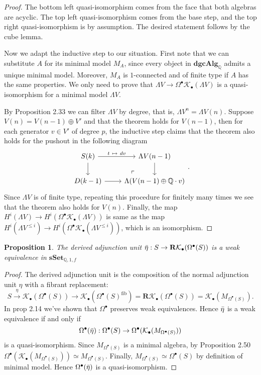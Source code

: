 \documentclass[psamsfonts]{amsart}
\newtheorem{prop}{Proposition}[section]
\theoremstyle{definition}
\newcommand{\Q}{\mathbb{Q}}
\newcommand{\sSet}{\mathbf{sSet}}
\newcommand{\dgcAlg}{\mathbf{dgcAlg}}
\numberwithin{equation}{section}
\begin{document}
\begin{proof}
The bottom left quasi-isomorphism comes from the face that both algebras are acyclic. The top left quasi-isomorphism comes from the base step, and the top right quasi-isomorphism is by assumption. The desired statement follows by the cube lemma.\medbreak

Now we adapt the inductive step to our situation. First note that we can substitute $A$ for its minimal model $M_A$, since every object in $\dgcAlg_\Q$ admits a unique minimal model. Moreover, $M_A$ is $1$-connected and of finite type if $A$ has the same properties. We only need to prove that $\Lambda V\to\Omega^\bullet\mathcal{K}_\bullet(\Lambda V)$ is a quasi-isomorphism for a minimal model $\Lambda V$.\medbreak

By Proposition 2.33 we can filter $\Lambda V$ by degree, that is, $\Lambda V^n=\Lambda V(n)$. Suppose $V(n)=V(n-1)\oplus V'$ and that the theorem holds for $V(n-1)$, then for each generator $v\in V'$ of degree $p$, the inductive step claims that the theorem also holds for the pushout in the following diagram
\[\begin{tikzcd}
S(k)\arrow[d]\arrow{r}{t\ \mapsto\ dv}&\Lambda V(n-1)\arrow[d]\\
D(k-1)\arrow[r]&\Lambda(V(n-1)\oplus\Q\cdot v) \arrow[ul, phantom, "\ulcorner",very near start]
\end{tikzcd}.\]
Since $\Lambda V$ is of finite type, repeating this procedure for finitely many times we see that the theorem also holds for $V(n)$. Finally, the map $H^i(\Lambda V)\to H^i(\Omega^\bullet\mathcal{K}_\bullet(\Lambda V))$ is same as the map $H^i(\Lambda V^{\leq i})\to H^i(\Omega^\bullet\mathcal{K}_\bullet(\Lambda V^{\leq i}))$, which is an isomorphism.
\end{proof}

\begin{prop}
The derived adjunction unit $\Bar{\eta}:S\to\mathbf{R}\mathcal{K}_\bullet(\Omega^\bullet(S))$ is a weak equivalence in $\sSet_{\Q,1,f}$
\end{prop}
\begin{proof}
The derived adjunction unit is the composition of the normal adjunction unit $\eta$ with a fibrant replacement:
\[S\xrightarrow{\ \eta\ }\mathcal{K}_\bullet(\Omega^\bullet(S))\longrightarrow\mathcal{K}_\bullet(\Omega^\bullet(S)^\textrm{fib})=\mathbf{R}\mathcal{K}_\bullet(\Omega^\bullet(S))=\mathcal{K}_\bullet(M_{\Omega^\bullet(S)}).\]
In prop 2.14 we've shown that $\Omega^\bullet$ preserves weak equivalences. Hence $\Bar{\eta}$ is a weak equivalence if and only if
\[\Omega^\bullet(\Bar{\eta}):\Omega^\bullet(S)\to\Omega^\bullet(\mathcal{K}_\bullet(M_{\Omega^\bullet(S)}))\]
is a quasi-isomorphism. Since $M_{\Omega^\bullet(S)}$ is a minimal algebra, by Proposition 2.50 $\Omega^\bullet(\mathcal{K}_\bullet(M_{\Omega^\bullet(S)}))\simeq M_{\Omega^\bullet(S)}$. Finally, $M_{\Omega^\bullet(S)}\simeq\Omega^\bullet(S)$ by definition of minimal model. Hence $\Omega^\bullet(\Bar{\eta})$ is a quasi-isomorphism.
\end{proof}
\end{document}
